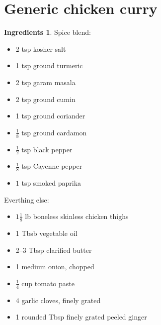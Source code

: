 \documentclass[a4paper,12pt]{scrreprt}
\theoremstyle{definition}
\newtheorem*{ingredients}{Ingredients}
\theoremstyle{plain}
\theoremstyle{remark}
\begin{document}
\section{Generic chicken curry}
\label{sec:chicken_tikka_masala}

\begin{ingredients}

  \leavevmode
  Spice blend:
  \begin{multicols}{2}
    \begin{itemize}
      \item 2 tsp kosher salt

      \item 1 tsp ground turmeric

      \item 2 tsp garam masala

      \item 2 tsp ground cumin

      \item 1 tsp ground coriander

      \item $\tfrac{1}{8}$ tsp ground cardamon

      \item $\tfrac{1}{2}$ tsp black pepper

      \item $\tfrac{1}{8}$ tsp Cayenne pepper

      \item $1$ tsp smoked paprika
    \end{itemize}
  \end{multicols}
  Everthing else:
  \begin{multicols}{2}
    \begin{itemize}
      \item $1\tfrac{1}{8}$ lb boneless skinless chicken thighs

      \item 1 Tbsb vegetable oil

      \item 2--3 Tbsp clarified butter

      \item 1 medium onion, chopped

      \item $\frac{1}{4}$ cup tomato paste

      \item 4 garlic cloves, finely grated

      \item 1 rounded Tbsp finely grated peeled ginger


\end{itemize}
\end{multicols}
\end{ingredients}
\end{document}
